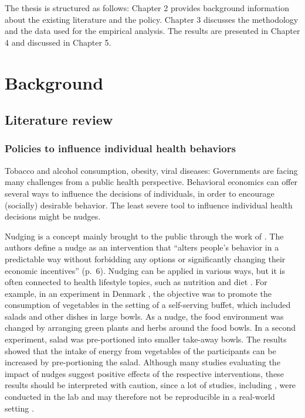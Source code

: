 \documentclass{scrbook}
\begin{document}
The thesis is structured as follows: Chapter 2 provides background
information about the existing literature and the policy. Chapter 3
discusses the methodology and the data used for the empirical analysis.
The results are presented in Chapter 4 and discussed in Chapter 5.

\chapter{Background}

\section{Literature review}

\subsection*{Policies to influence individual health behaviors}

Tobacco and alcohol consumption, obesity, viral diseases: Governments
are facing many challenges from a public health perspective. Behavioral
economics can offer several ways to influence the decisions of
individuals, in order to encourage (socially) desirable behavior. The
least severe tool to influence individual health decisions might be
nudges.

Nudging is a concept mainly brought to the public through the work of
\textcite{thaler_nudge_2008}. The authors define a nudge as an
intervention that ``alters people's behavior in a predictable way
without forbidding any options or significantly changing their economic
incentives'' (p.~6). Nudging can be applied in various ways, but it is
often connected to health lifestyle topics, such as nutrition and diet
\parencite{ledderer_nudging_2020}. For example, in an experiment in
Denmark \parencite{friis_comparison_2017}, the objective was to promote
the consumption of vegetables in the setting of a self-serving buffet,
which included salads and other dishes in large bowls. As a nudge, the
food environment was changed by arranging green plants and herbs around
the food bowls. In a second experiment, salad was pre-portioned into
smaller take-away bowls. The results showed that the intake of energy
from vegetables of the participants can be increased by pre-portioning
the salad. Although many studies evaluating the impact of nudges suggest
positive effects of the respective interventions, these results should
be interpreted with caution, since a lot of studies, including
\textcite{friis_comparison_2017}, were conducted in the lab and may
therefore not be reproducible in a real-world setting
\parencite{ledderer_nudging_2020}.
\end{document}
